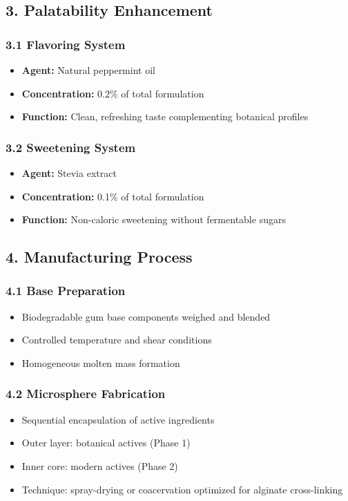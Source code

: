 \documentclass[12pt]{article}
\begin{document}
\subsection*{3. Palatability Enhancement}

\subsubsection*{3.1 Flavoring System}
\begin{itemize}
    \item \textbf{Agent:} Natural peppermint oil
    \item \textbf{Concentration:} 0.2\% of total formulation
    \item \textbf{Function:} Clean, refreshing taste complementing botanical profiles
\end{itemize}

\subsubsection*{3.2 Sweetening System}
\begin{itemize}
    \item \textbf{Agent:} Stevia extract
    \item \textbf{Concentration:} 0.1\% of total formulation
    \item \textbf{Function:} Non-caloric sweetening without fermentable sugars
\end{itemize}

\subsection*{4. Manufacturing Process}

\subsubsection*{4.1 Base Preparation}
\begin{itemize}
    \item Biodegradable gum base components weighed and blended
    \item Controlled temperature and shear conditions
    \item Homogeneous molten mass formation
\end{itemize}

\subsubsection*{4.2 Microsphere Fabrication}
\begin{itemize}
    \item Sequential encapsulation of active ingredients
    \item Outer layer: botanical actives (Phase 1)
    \item Inner core: modern actives (Phase 2)
    \item Technique: spray-drying or coacervation optimized for alginate cross-linking
\end{itemize}
\end{document}
